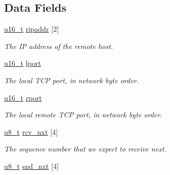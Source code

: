 \subsection*{Data Fields}
\begin{CompactItemize}
\item 
\hypertarget{a00028_1cd04dc65f6e7d94b0be8b38bf0d55ac}{
\hyperlink{a00070_gfc6499c1f28697aa3bfc2804d496fd11}{u16\_\-t} \hyperlink{a00028_1cd04dc65f6e7d94b0be8b38bf0d55ac}{ripaddr} \mbox{[}2\mbox{]}}
\label{a00028_1cd04dc65f6e7d94b0be8b38bf0d55ac}

\begin{CompactList}\small\item\em The IP address of the remote host. \item\end{CompactList}\item 
\hypertarget{a00028_0cd09beee671e7e9efb0b4aced10249e}{
\hyperlink{a00070_gfc6499c1f28697aa3bfc2804d496fd11}{u16\_\-t} \hyperlink{a00028_0cd09beee671e7e9efb0b4aced10249e}{lport}}
\label{a00028_0cd09beee671e7e9efb0b4aced10249e}

\begin{CompactList}\small\item\em The local TCP port, in network byte order. \item\end{CompactList}\item 
\hypertarget{a00028_1df6aa054ef2fa634ac4c6f418228285}{
\hyperlink{a00070_gfc6499c1f28697aa3bfc2804d496fd11}{u16\_\-t} \hyperlink{a00028_1df6aa054ef2fa634ac4c6f418228285}{rport}}
\label{a00028_1df6aa054ef2fa634ac4c6f418228285}

\begin{CompactList}\small\item\em The local remote TCP port, in network byte order. \item\end{CompactList}\item 
\hypertarget{a00028_70297b3e6d4eaae7bd828cb50bd1efe3}{
\hyperlink{a00070_ge081489b4906f65a3cb18e9fbe9f8d23}{u8\_\-t} \hyperlink{a00028_70297b3e6d4eaae7bd828cb50bd1efe3}{rcv\_\-nxt} \mbox{[}4\mbox{]}}
\label{a00028_70297b3e6d4eaae7bd828cb50bd1efe3}

\begin{CompactList}\small\item\em The sequence number that we expect to receive next. \item\end{CompactList}\item 
\hypertarget{a00028_8f6b08a5ba2a8d75ca7279e2056aa8c6}{
\hyperlink{a00070_ge081489b4906f65a3cb18e9fbe9f8d23}{u8\_\-t} \hyperlink{a00028_8f6b08a5ba2a8d75ca7279e2056aa8c6}{snd\_\-nxt} \mbox{[}4\mbox{]}}
\label{a00028_8f6b08a5ba2a8d75ca7279e2056aa8c6}


\end{CompactItemize}
